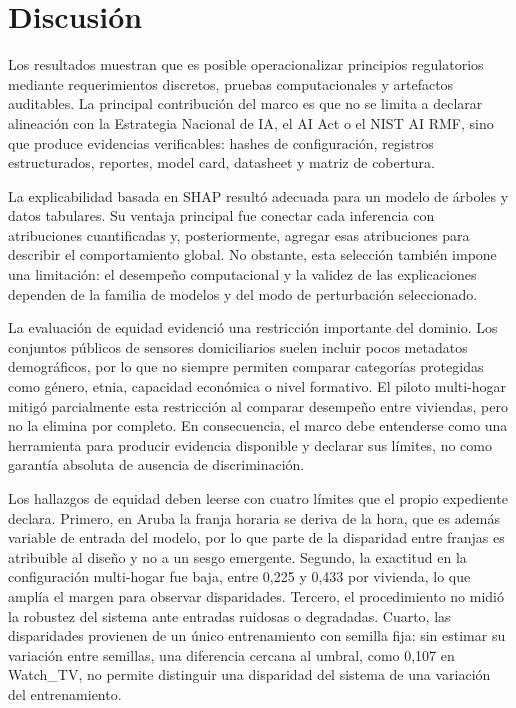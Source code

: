 
\section{Discusión}

Los resultados muestran que es posible operacionalizar principios regulatorios
mediante requerimientos discretos, pruebas computacionales y artefactos
auditables. La principal contribución del marco es que no se limita a declarar
alineación con la Estrategia Nacional de IA, el AI Act o el NIST AI RMF, sino
que produce evidencias verificables: hashes de configuración, registros
estructurados, reportes, model card, datasheet y matriz de cobertura.

La explicabilidad basada en SHAP resultó adecuada para un modelo de árboles y
datos tabulares. Su ventaja principal fue conectar cada inferencia con
atribuciones cuantificadas y, posteriormente, agregar esas atribuciones para
describir el comportamiento global. No obstante, esta selección también impone
una limitación: el desempeño computacional y la validez de las explicaciones
dependen de la familia de modelos y del modo de perturbación seleccionado.

La evaluación de equidad evidenció una restricción importante del dominio. Los
conjuntos públicos de sensores domiciliarios suelen incluir pocos metadatos
demográficos, por lo que no siempre permiten comparar categorías protegidas
como género, etnia, capacidad económica o nivel formativo. El piloto
multi-hogar mitigó parcialmente esta restricción al comparar desempeño entre
viviendas, pero no la elimina por completo. En consecuencia, el marco debe
entenderse como una herramienta para producir evidencia disponible y declarar
sus límites, no como garantía absoluta de ausencia de discriminación.

Los hallazgos de equidad deben leerse con cuatro límites que el propio
expediente declara. Primero, en Aruba la franja horaria se deriva de la hora,
que es además variable de entrada del modelo, por lo que parte de la disparidad
entre franjas es atribuible al diseño y no a un sesgo emergente. Segundo, la
exactitud en la configuración multi-hogar fue baja, entre 0,225 y 0,433 por
vivienda, lo que amplía el margen para observar disparidades. Tercero, el
procedimiento no midió la robustez del sistema ante entradas ruidosas o
degradadas. Cuarto, las disparidades provienen de un único entrenamiento con
semilla fija: sin estimar su variación entre semillas, una diferencia cercana
al umbral, como 0,107 en Watch\_TV, no permite distinguir una disparidad del
sistema de una variación del entrenamiento.

